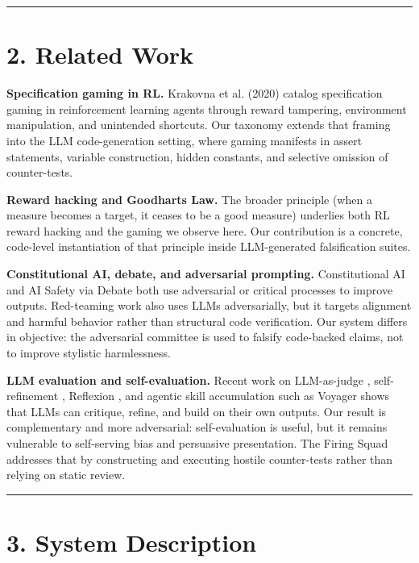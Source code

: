 \documentclass[
]{article}
\begin{document}
\begin{center}\rule{0.5\linewidth}{0.5pt}\end{center}

\section{2. Related Work}\label{2-related-work}

\textbf{Specification gaming in RL.} Krakovna et al. (2020) catalog
specification gaming in reinforcement learning agents through reward
tampering, environment manipulation, and unintended shortcuts. Our
taxonomy extends that framing into the LLM code-generation setting,
where gaming manifests in assert statements, variable construction,
hidden constants, and selective omission of counter-tests.

\textbf{Reward hacking and Goodhart\textquotesingle s Law.} The broader
principle \citep{goodhart1975} (when a measure becomes a target, it
ceases to be a good measure) underlies both RL reward hacking and the
gaming we observe here. Our contribution is a concrete, code-level
instantiation of that principle inside LLM-generated falsification
suites.

\textbf{Constitutional AI, debate, and adversarial prompting.}
Constitutional AI \citep{bai2022} and AI Safety via Debate \citep{irving2018} both use adversarial or critical processes to improve
outputs. Red-teaming work \citep{perez2022} also uses LLMs
adversarially, but it targets alignment and harmful behavior rather than
structural code verification. Our system differs in objective: the
adversarial committee is used to falsify code-backed claims, not to
improve stylistic harmlessness.

\textbf{LLM evaluation and self-evaluation.} Recent work on LLM-as-judge \citep{zheng2023}, self-refinement \citep{madaan2023}, Reflexion \citep{shinn2023reflexion}, and agentic skill accumulation such as Voyager \citep{wang2023voyager} shows that LLMs can critique, refine, and build on
their own outputs. Our result is complementary and more adversarial:
self-evaluation is useful, but it remains vulnerable to self-serving
bias and persuasive presentation. The Firing Squad addresses that by
constructing and executing hostile counter-tests rather than relying on
static review.

\begin{center}\rule{0.5\linewidth}{0.5pt}\end{center}

\section{3. System Description}\label{3-system-description}
\end{document}
